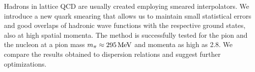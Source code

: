Hadrons in lattice QCD are usually created employing smeared interpolators.
We introduce a new quark smearing that
allows us to maintain small statistical errors and good overlaps of hadronic
wave functions with the respective ground states, also at high spatial
momenta. The method is successfully tested for the pion and the nucleon
at a pion mass $m_{\pi}\approx 295\,\textmd{MeV}$ and momenta as high as
2.8. We compare the results obtained to dispersion
relations and suggest further optimizations.
